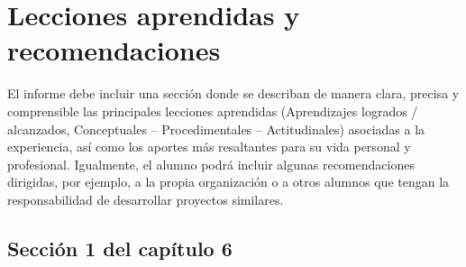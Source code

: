 
\chapter{Lecciones aprendidas y recomendaciones} %
\label{Chapter6} %

El informe debe incluir una sección donde se describan de manera clara, precisa y comprensible las principales lecciones aprendidas (Aprendizajes logrados / alcanzados, Conceptuales – Procedimentales – Actitudinales) asociadas a la experiencia, así como los aportes más resaltantes para su vida personal y profesional. Igualmente, el alumno podrá incluir algunas recomendaciones dirigidas, por ejemplo, a la propia organización o a otros alumnos que tengan la responsabilidad de desarrollar proyectos similares.

\section{Sección 1 del capítulo 6}